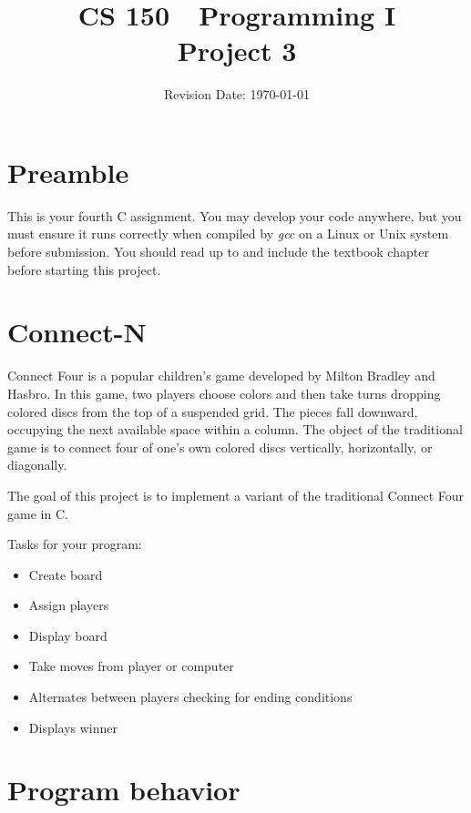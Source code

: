 \documentclass{article}
\title{CS 150~~Programming I\\
Project 3}
\date{Revision Date: \today}
\begin{document}
\maketitle

\thispagestyle{empty}

\W\subsubsection{}
\W\htmlrule



\section*{Preamble}
This is your fourth C assignment.
You may develop your code anywhere,
but you must ensure it
runs correctly when compiled by {\it gcc}
on a Linux or Unix system
before submission.
You should read up to and include the textbook chapter
before starting this project.


\section*{Connect-N}

Connect Four is a popular children's game developed by Milton Bradley 
and Hasbro. In this game, two players choose colors and then take turns 
dropping colored discs from the top of a suspended grid. The pieces fall 
downward, occupying the next available space within a column. The object 
of the traditional game is to connect four of one's own colored discs 
vertically, horizontally, or diagonally.

The goal of this project is to implement a variant of the traditional 
Connect Four game in C.

Tasks for your program:

\begin{itemize}
\item
    Create board
\item
    Assign players
\item
    Display board
\item
    Take moves from player or computer
\item
    Alternates between players checking for ending conditions
\item
    Displays winner
\end{itemize}


\section*{Program behavior}
\end{document}

